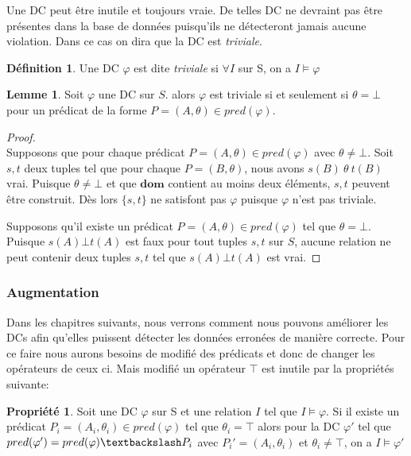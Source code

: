 \documentclass[letterpaper, 12pt]{report}
\theoremstyle{definition}
\newtheorem{mydef}{Définition}
\newtheorem{myprop}{Propriété}
\newtheorem{mylemma}{Lemme}
\newcommand{\dom}{\mathbf{dom}}
\newcommand{\alinea}{
\hspace*{0.5cm}}
\begin{document}
Une DC peut être inutile et toujours vraie. De telles DC ne devraint pas être présentes dans la base de données puisqu'ils ne détecteront jamais aucune violation. Dans ce cas on dira que la DC est \emph{triviale}. 
\begin{mydef}
	Une DC $\varphi$ est dite \emph{triviale} si $\forall I$ sur S, on a $I \models \varphi$
\end{mydef}

\begin{mylemma} \label{trivialLemma}
Soit $\varphi$ une DC sur $S$. alors $\varphi$ est triviale si et seulement si $\theta = \bot$ pour un prédicat de la forme $P=(A,\theta) \in pred(\varphi)$.
\end{mylemma}
\begin{proof}
~\\
\alinea \framebox{$\implies$}
Supposons que pour chaque prédicat $P=(A,\theta) \in pred(\varphi)$ avec $\theta \neq \bot$. Soit $s,t$ deux tuples tel que pour chaque $P=(B,\theta)$, nous avons $s(B)\ \theta\ t(B)$ vrai.
Puisque $\theta \neq \bot$ et que $\dom$ contient au moins deux éléments, $s,t$ peuvent être construit. Dès lors $\{s,t\}$ ne satisfont pas $\varphi$ puisque $\varphi$ n'est pas triviale.

\framebox{$\impliedby$}
Supposons qu'il existe un prédicat $P=(A,\theta) \in pred (\varphi)$ tel que $\theta = \bot$.
Puisque $s(A) \bot t(A)$ est faux pour tout tuples $s,t$ sur $S$, aucune relation ne peut contenir deux tuples $s,t$ tel que $s(A) \bot t(A)$ est vrai.
\end{proof}


\subsubsection{Augmentation}

Dans les chapitres suivants, nous verrons comment nous pouvons améliorer les DCs afin qu'elles puissent détecter les données erronées de manière correcte. Pour ce faire nous aurons besoins de modifié des prédicats et donc de changer les opérateurs de ceux ci. Mais modifié un opérateur $\top$ est inutile par la propriétés suivante:

\begin{myprop}
	Soit une DC $\varphi$ sur S et une relation $I$ tel que $I \models \varphi$. Si il existe un prédicat $P_i = (A_i,\theta_i) \in pred(\varphi)$ tel que $\theta_i = \top$ alors pour la DC $\varphi'$ tel que $pred( \varphi' ) = pred( \varphi ) \textbackslash P_i$ avec $P_i' =(A_i,\theta_i)$ et $\theta_i \neq \top$, on a $I \models \varphi'$
\end{myprop}
\end{document}
